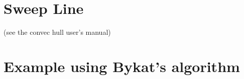 \section{Sweep Line}

  (see the convec hull user's manual)


\section{Example using Bykat's algorithm}
